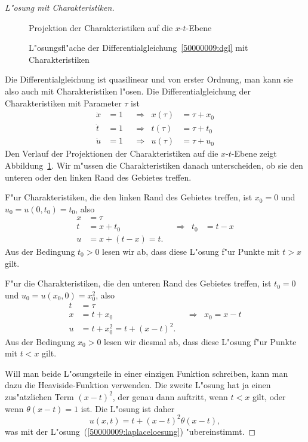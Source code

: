 \begin{proof}[L"osung mit Charakteristiken]
\begin{figure}
\centering
{}
\caption{Projektion der Charakteristiken auf die $x$-$t$-Ebene
\label{50000009:charakteristiken}}
\end{figure}
\begin{figure}
\centering
{}
\caption{L"osungsfl"ache der Differentialgleichung~\ref{50000009:dgl}
mit Charakteristiken
\label{50000009:loesung}}
\end{figure}
Die Differentialgleichung ist quasilinear und von erster Ordnung, man kann
sie also auch mit Charakteristiken l"osen.
Die Differentialgleichung der Charakteristiken mit Parameter $\tau$ ist
\[
\begin{aligned}
\dot x&=1& &\Rightarrow& x(\tau)&=\tau + x_0\\
\dot t&=1& &\Rightarrow& t(\tau)&=\tau + t_0\\
\dot u&=1& &\Rightarrow& u(\tau)&=\tau + u_0
\end{aligned}
\]
Den Verlauf der Projektionen der Charakteristiken auf die $x$-$t$-Ebene zeigt
Abbildung~\ref{50000009:charakteristiken}.
Wir m"ussen die Charakteristiken danach unterscheiden, ob sie den unteren
oder den linken Rand des Gebietes treffen.

F"ur Charakteristiken, die den linken Rand des Gebietes treffen, ist $x_0=0$
und $u_0=u(0,t_0)=t_0$, also
\[
\begin{aligned}
x&=\tau\\
t&=x+t_0&&\Rightarrow& t_0&=t-x\\
u&=x+(t-x)=t.
\end{aligned}
\]
Aus der Bedingung $t_0>0$ lesen wir ab, dass diese L"osung f"ur Punkte
mit $t>x$ gilt.

F"ur die Charakteristiken, die den unteren Rand des Gebietes treffen,
ist $t_0=0$ und $u_0=u(x_0,0)=x_0^2$, also
\[
\begin{aligned}
t&=\tau\\
x&=t+x_0&&\Rightarrow&x_0=x-t\\
u&=t+x_0^2=t+(x-t)^2.
\end{aligned}
\]
Aus der Bedingung $x_0>0$ lesen wir diesmal ab, dass diese L"osung f"ur Punkte
mit $t < x$ gilt.

Will man beide L"osungsteile in einer einzigen Funktion schreiben, kann
man dazu die Heaviside-Funktion verwenden. Die zweite L"osung hat ja
einen zus"atzlichen Term $(x-t)^2$, der genau dann auftritt, wenn $t<x$
gilt, oder wenn $\theta(x-t)=1$ ist.
Die L"osung ist daher
\begin{equation}
u(x,t)=t+(x-t)^2\theta(x-t),
\label{50000009:charakteristikenloesung}
\end{equation}
was mit der L"osung~(\ref{50000009:laplaceloesung}) "ubereinstimmt.
\end{proof}

